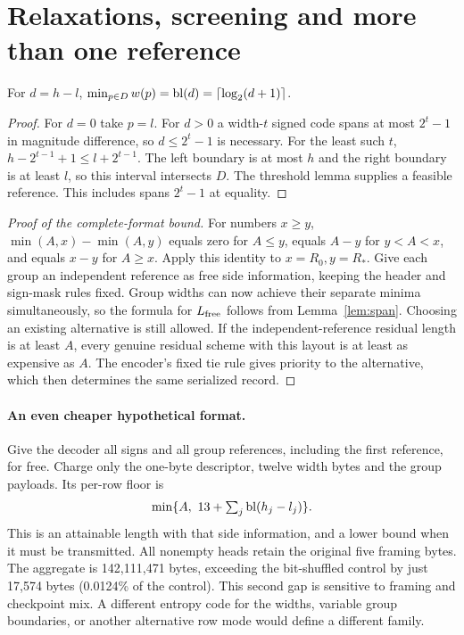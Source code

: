\section{Relaxations, screening and more than one reference}\label{app:multiple}
\begin{lemma}\label{lem:span}
For $d=h-l$, $\min_{p\in D}w(p)=\operatorname{bl}(d)=\lceil\log_2(d+1)\rceil$.
\end{lemma}
\begin{proof}
For $d=0$ take $p=l$. For $d>0$ a width-$t$ signed code spans at most $2^t-1$ in magnitude difference, so $d\le2^t-1$ is necessary. For the least such $t$, $h-2^{t-1}+1\le l+2^{t-1}$. The left boundary is at most $h$ and the right boundary is at least $l$, so this interval intersects $D$. The threshold lemma supplies a feasible reference. This includes spans $2^t-1$ at equality.
\end{proof}
\begin{proof}[Proof of the complete-format bound]
For numbers $x\ge y$, $\min(A,x)-\min(A,y)$ equals zero for $A\le y$, equals $A-y$ for $y<A<x$, and equals $x-y$ for $A\ge x$. Apply this identity to $x=R_0,y=R_*$. Give each group an independent reference as free side information, keeping the header and sign-mask rules fixed. Group widths can now achieve their separate minima simultaneously, so the formula for $L_{\rm free}$ follows from Lemma~\ref{lem:span}. Choosing an existing alternative is still allowed. If the independent-reference residual length is at least $A$, every genuine residual scheme with this layout is at least as expensive as $A$. The encoder's fixed tie rule gives priority to the alternative, which then determines the same serialized record.
\end{proof}

\paragraph{An even cheaper hypothetical format.} Give the decoder all signs and all group references, including the first reference, for free. Charge only the one-byte descriptor, twelve width bytes and the group payloads. Its per-row floor is
\[
 \min\{A,\ 13+\textstyle\sum_j\bitlen(h_j-l_j)\}.
\]
This is an attainable length with that side information, and a lower bound when it must be transmitted. All nonempty heads retain the original five framing bytes. The aggregate is 142,111,471 bytes, exceeding the bit-shuffled control by just 17,574 bytes (0.0124\% of the control). This second gap is sensitive to framing and checkpoint mix. A different entropy code for the widths, variable group boundaries, or another alternative row mode would define a different family.


